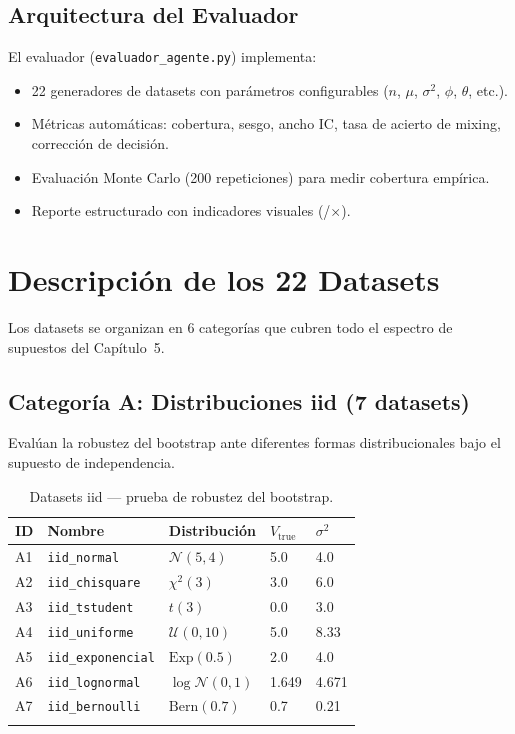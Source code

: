 \documentclass[12pt,a4paper]{article}
\newcommand{\ok}{\textcolor{cbgreen}{\checkmark}}
\newcommand{\fail}{\textcolor{cbred}{$\times$}}
\begin{document}
\subsection{Arquitectura del Evaluador}

El evaluador (\texttt{evaluador\_agente.py}) implementa:

\begin{itemize}
    \item 22 generadores de datasets con parámetros configurables ($n$, $\mu$, $\sigma^2$, $\phi$, $\theta$, etc.).
    \item Métricas automáticas: cobertura, sesgo, ancho IC, tasa de acierto de mixing, corrección de decisión.
    \item Evaluación Monte Carlo (200 repeticiones) para medir cobertura empírica.
    \item Reporte estructurado con indicadores visuales (\ok/\fail).
\end{itemize}

\section{Descripción de los 22 Datasets}

Los datasets se organizan en 6 categorías que cubren todo el espectro de supuestos del Capítulo~5.

\subsection{Categoría A: Distribuciones iid (7 datasets)}

Evalúan la robustez del bootstrap ante diferentes formas distribucionales bajo el supuesto de independencia.

\begin{longtable}{@{}lllll@{}}
    \toprule
    ID & Nombre & Distribución & $V_{\text{true}}$ & $\sigma^2$ \\
    \midrule
    \endhead
    A1 & \texttt{iid\_normal} & $\mathcal{N}(5, 4)$ & 5.0 & 4.0 \\
    A2 & \texttt{iid\_chisquare} & $\chi^2(3)$ & 3.0 & 6.0 \\
    A3 & \texttt{iid\_tstudent} & $t(3)$ & 0.0 & 3.0 \\
    A4 & \texttt{iid\_uniforme} & $\mathcal{U}(0, 10)$ & 5.0 & 8.33 \\
    A5 & \texttt{iid\_exponencial} & $\text{Exp}(0.5)$ & 2.0 & 4.0 \\
    A6 & \texttt{iid\_lognormal} & $\log\mathcal{N}(0, 1)$ & 1.649 & 4.671 \\
    A7 & \texttt{iid\_bernoulli} & $\text{Bern}(0.7)$ & 0.7 & 0.21 \\
    \bottomrule
    \caption{Datasets iid --- prueba de robustez del bootstrap.}
\end{longtable}
\end{document}
